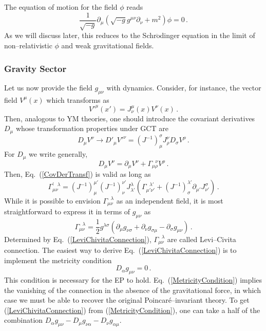 \documentclass[12pt]{article}
\begin{document}
The equation of motion for the field $\phi$ reads
\begin{equation}
\dfrac{1}{\sqrt{-g}}\partial_\mu(\sqrt{-g}g^{\mu\nu}\partial_\nu+m^2)\phi=0 \,.
\end{equation}
As we will discuss later, this reduces to the Schr$\ddot{\text{o}}$dinger equation in the limit of non--relativistic $\phi$ and weak gravitational fields.

\subsubsection{Gravity Sector}

Let us now provide the field $g_{\mu\nu}$ with dynamics. Consider, for instance, the vector field $V^\mu(x)$ which transforms as
\begin{equation}
V'^\mu(x')=J^\mu_\nu(x)V^\nu(x) \,.
\end{equation}
Then, analogous to YM theories, one should introduce the covariant derivatives $D_\mu$ whose transformation properties under GCT are
\begin{equation}\label{CovDerTransf}
D_\mu V^\nu\rightarrow D'_\mu V'^\nu=(J^{-1})^\sigma_\mu J^\nu_\rho D_\sigma V^\rho \,.
\end{equation}
For $D_\mu$ we write generally,
\begin{equation}\label{CovDerVector}
D_\mu V^\nu=\partial_\mu V^\nu+\Gamma^{~~~\nu}_{\mu\rho}V^\rho \,.
\end{equation}
Then, Eq.~(\ref{CovDerTransf}) is valid as long as
\begin{equation}
\Gamma_{\mu\nu}^{'~~~\lambda}=(J^{-1})^{\mu'}_\mu (J^{-1})^{\nu'}_\nu J^\lambda_{\lambda'}\left(\Gamma_{\mu'\nu'}^{~~~\lambda'}+(J^{-1})^{\lambda'}_\sigma\partial_{\mu'}J^\sigma_{\nu'}\right) \,.
\end{equation}
While it is possible to envision $\Gamma_{\mu\nu}^{~~~\lambda}$ as an independent field, it is most straightforward to
express it in terms of $g_{\mu\nu}$ as
\begin{equation}\label{LeviChivitaConnection}
\Gamma_{\mu\nu}^{~~~\lambda}=\dfrac{1}{2}g^{\lambda\sigma}(\partial_\mu g_{\nu\sigma}+\partial_\nu g_{\sigma\mu}-\partial_\sigma g_{\mu\nu}) \,.
\end{equation}
Determined by Eq.~(\ref{LeviChivitaConnection}), $\Gamma_{\mu\nu}^{~~~\lambda}$ are called Levi--Civita connection. The easiest way to derive Eq.~(\ref{LeviChivitaConnection}) is to implement the metricity condition
\begin{equation}\label{MetricityCondition}
D_{\alpha}g_{\mu\nu}=0 \,.
\end{equation}
This condition is necessary for the EP to hold. Eq.~(\ref{MetricityCondition}) implies the vanishing of the connection in the absence of the gravitational force, in which case we must be able to recover the original Poincar\'e--invariant theory. To get (\ref{LeviChivitaConnection}) from (\ref{MetricityCondition}), one can take a half of the combination $D_{\alpha}g_{\mu\nu}-D_{\mu}g_{\nu\alpha}-D_{\nu}g_{\alpha\mu}$.
\end{document}
